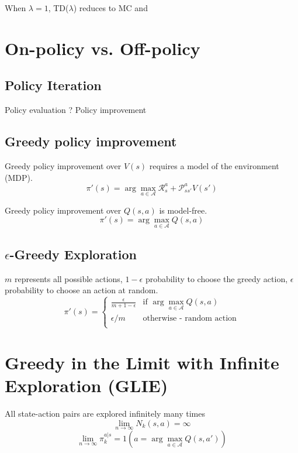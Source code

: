 When $\lambda = 1$, TD($\lambda$) reduces to MC and


\section{On-policy vs. Off-policy}\label{sec:on-policy-vs-off-policy}

\subsection{Policy Iteration}\label{subsec:policy-iteration}
Policy evaluation ?
Policy improvement

\subsection{Greedy policy improvement}\label{subsec:greedy-policy-improvement}
Greedy policy improvement over $V(s)$ requires a model of the environment (MDP).
\[
    \pi'(s) = \arg\max_{a\in\mathcal{A}}{\mathcal{R}_{s}^{a} + \mathcal{P}_{ss'}^{a} V(s')}
\]

Greedy policy improvement over $Q(s,a)$ is model-free.
\[
    \pi'(s) = \arg\max_{a\in\mathcal{A}}Q(s,a)
\]

\subsection{$\epsilon$-Greedy Exploration}\label{subsec:epsilon-greedy-exploration}
$m$ represents all possible actions, $1 - \epsilon$ probability to choose the greedy action,
$\epsilon$ probability to choose an action at random.
\[
    \pi'(s) = \begin{cases}
                  \frac{\epsilon}{m+1-\epsilon} & \text{if } \arg\max_{a\in\mathcal{A}}Q(s,a) \\
                  \epsilon/m & \text{otherwise - random action} \\
    \end{cases}
\]


\section{Greedy in the Limit with Infinite Exploration (GLIE)}\label{sec:greedy-in-the-limit-with-infinite-exploration}

All state-action pairs are explored infinitely many times
\[
    \lim_{n\to\infty}N_k(s,a) = \infty
\]
\[
    \lim_{n\to\infty}\pi_{k}^{a|s}=1(a=\arg\max_{a\in\mathcal{A}}Q(s,a'))
\]

